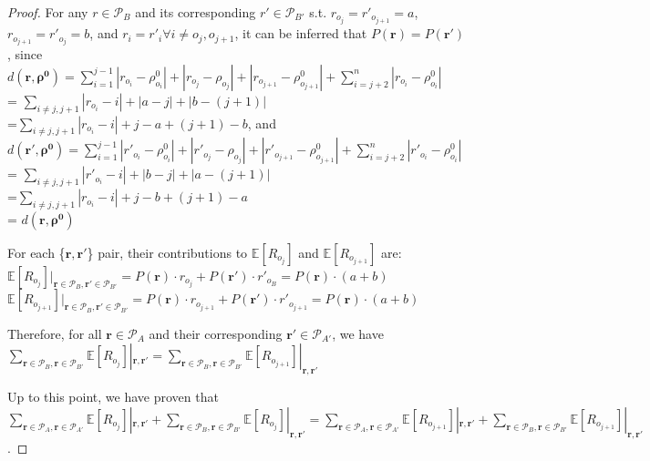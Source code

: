 \documentclass[11pt, oneside]{article}   	%
\begin{document}
\begin{proof}
For any $r \in \mathcal{P}_B$ and its corresponding $r' \in \mathcal{P}_{B'}$ s.t. $r_{o_j} = r'_{o_{j+1}} = a$, $r_{o_{j+1}} = r'_{o_{j}} = b$, and $r_i = r'_i \forall i\neq o_j, o_{j+1}$, it can be inferred that $P(\bm{r}) = P(\bm{r'})$, since \\
$d(\bm{r}, \bm{\rho^0}) = \sum\limits_{i=1}^{j-1}|r_{o_i} - \rho^0_{o_i}| + |r_{o_j} - \rho_{o_j}| + |r_{o_{j+1}} - \rho^0_{o_{j+1}}| + \sum\limits_{i = j+2}^{n}|r_{o_i} - \rho^0_{o_{i}}|$ \\
= $\sum\limits_{i \neq j, j+1} |r_{o_i} - i| + |a-j| + |b - (j+1)|$\\
=$\sum\limits_{i \neq j, j+1} |r_{o_i} - i| + j-a + (j+1)-b$, and \\

$d(\bm{r'}, \bm{\rho^0}) = \sum\limits_{i=1}^{j-1}|r'_{o_i} - \rho^0_{o_i}| + |r'_{o_j} - \rho_{o_j}| + |r'_{o_{j+1}} - \rho^0_{o_{j+1}}| + \sum\limits_{i = j+2}^{n}|r'_{o_i} - \rho^0_{o_{i}}|$ \\
= $\sum\limits_{i \neq j, j+1} |r'_{o_i} - i| + |b-j| + |a - (j+1)|$\\
=$\sum\limits_{i \neq j, j+1} |r_{o_i} - i| + j-b + (j+1)- a$ \\
= $d(\bm{r}, \bm{\rho^0}) $

For each \{$\bm{r}, \bm{r'}$\} pair, their contributions to $\mathbb{E}[R_{o_j}]$ and $\mathbb{E}[R_{o_{j+1}}]$ are: \\
$\mathbb{E}[R_{o_j}]|_{\bm{r}\in \mathcal{P}_B,\bm{r'}\in \mathcal{P}_{B'}} = P(\bm{r})\cdot r_{o_j} + P(\bm{r'})\cdot r'_{o_B} = P(\bm{r})\cdot (a+b) $ \\

$\mathbb{E}[R_{o_{j+1}}]|_{\bm{r}\in \mathcal{P}_B,\bm{r'}\in \mathcal{P}_{B'}} = P(\bm{r})\cdot r_{o_{j+1}} + P(\bm{r'})\cdot r'_{o_{j+1}} = P(\bm{r})\cdot (a+b)$ 

Therefore, for all $\bm{r}\in \mathcal{P}_A$ and their corresponding $\bm{r'}\in \mathcal{P}_{A'}$, we have \\
$\sum\limits_{\bm{r}\in \mathcal{P}_B, \bm{r}\in \mathcal{P}_{B'}}\mathbb{E}[R_{o_j}] |_{\bm{r}, \bm{r'}} = \sum\limits_{\bm{r}\in \mathcal{P}_B, \bm{r}\in \mathcal{P}_{B'}}\mathbb{E}[R_{o_{j+1}}] |_{\bm{r}, \bm{r'}}$

Up to this point, we have proven that \\
$\sum\limits_{\bm{r}\in \mathcal{P}_A, \bm{r}\in \mathcal{P}_{A'}}\mathbb{E}[R_{o_j}] |_{\bm{r}, \bm{r'}} + \sum\limits_{\bm{r}\in \mathcal{P}_B, \bm{r}\in \mathcal{P}_{B'}}\mathbb{E}[R_{o_j}] |_{\bm{r}, \bm{r'}}= \sum\limits_{\bm{r}\in \mathcal{P}_A, \bm{r}\in \mathcal{P}_{A'}}\mathbb{E}[R_{o_{j+1}}] |_{\bm{r}, \bm{r'}}+\sum\limits_{\bm{r}\in \mathcal{P}_B, \bm{r}\in \mathcal{P}_{B'}}\mathbb{E}[R_{o_{j+1}}] |_{\bm{r}, \bm{r'}}$.


\end{proof}
\end{document}
